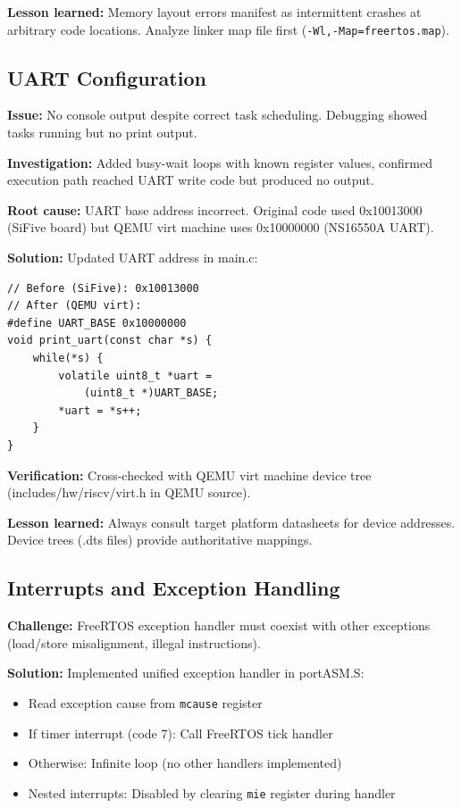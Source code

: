 \documentclass[conference]{IEEEtran}
\begin{document}
\textbf{Lesson learned:} Memory layout errors manifest as intermittent crashes at arbitrary code locations. Analyze linker map file first (\texttt{-Wl,-Map=freertos.map}).

\subsection{UART Configuration}
\textbf{Issue:} No console output despite correct task scheduling. Debugging showed tasks running but no print output.

\textbf{Investigation:} Added busy-wait loops with known register values, confirmed execution path reached UART write code but produced no output.

\textbf{Root cause:} UART base address incorrect. Original code used 0x10013000 (SiFive board) but QEMU virt machine uses 0x10000000 (NS16550A UART).

\textbf{Solution:} Updated UART address in main.c:
\begin{lstlisting}
// Before (SiFive): 0x10013000
// After (QEMU virt):
#define UART_BASE 0x10000000
void print_uart(const char *s) {
    while(*s) {
        volatile uint8_t *uart = 
            (uint8_t *)UART_BASE;
        *uart = *s++;
    }
}
\end{lstlisting}

\textbf{Verification:} Cross-checked with QEMU virt machine device tree (includes/hw/riscv/virt.h in QEMU source).

\textbf{Lesson learned:} Always consult target platform datasheets for device addresses. Device trees (.dts files) provide authoritative mappings.

\subsection{Interrupts and Exception Handling}
\textbf{Challenge:} FreeRTOS exception handler must coexist with other exceptions (load/store misalignment, illegal instructions).

\textbf{Solution:} Implemented unified exception handler in portASM.S:
\begin{itemize}
    \item Read exception cause from \texttt{mcause} register
    \item If timer interrupt (code 7): Call FreeRTOS tick handler
    \item Otherwise: Infinite loop (no other handlers implemented)
    \item Nested interrupts: Disabled by clearing \texttt{mie} register during handler
\end{itemize}
\end{document}
